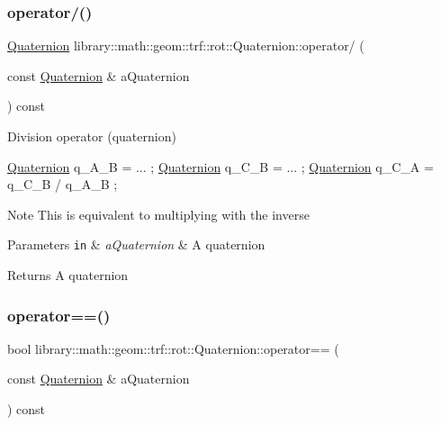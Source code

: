 \subsubsection{\texorpdfstring{operator/()}{operator/()}}
{\footnotesize\ttfamily \hyperlink{classlibrary_1_1math_1_1geom_1_1trf_1_1rot_1_1_quaternion}{Quaternion} library\+::math\+::geom\+::trf\+::rot\+::\+Quaternion\+::operator/ (\begin{DoxyParamCaption}\item[{const \hyperlink{classlibrary_1_1math_1_1geom_1_1trf_1_1rot_1_1_quaternion}{Quaternion} \&}]{a\+Quaternion }\end{DoxyParamCaption}) const}



Division operator (quaternion) 


\begin{DoxyCode}
\hyperlink{classlibrary_1_1math_1_1geom_1_1trf_1_1rot_1_1_quaternion_aa7f459a08f5af38b9f7676a6bf36a21c}{Quaternion} q\_A\_B = ... ;
\hyperlink{classlibrary_1_1math_1_1geom_1_1trf_1_1rot_1_1_quaternion_aa7f459a08f5af38b9f7676a6bf36a21c}{Quaternion} q\_C\_B = ... ;
\hyperlink{classlibrary_1_1math_1_1geom_1_1trf_1_1rot_1_1_quaternion_aa7f459a08f5af38b9f7676a6bf36a21c}{Quaternion} q\_C\_A = q\_C\_B / q\_A\_B ;
\end{DoxyCode}


\begin{DoxyNote}{Note}
This is equivalent to multiplying with the inverse
\end{DoxyNote}

\begin{DoxyParams}[1]{Parameters}
\mbox{\tt in}  & {\em a\+Quaternion} & A quaternion \\
\hline
\end{DoxyParams}
\begin{DoxyReturn}{Returns}
A quaternion 
\end{DoxyReturn}
\mbox{\label{classlibrary_1_1math_1_1geom_1_1trf_1_1rot_1_1_quaternion_aa3ab0b3893007c45e5cc8ed5e1d16ef0}} 
\subsubsection{\texorpdfstring{operator==()}{operator==()}}
{\footnotesize\ttfamily bool library\+::math\+::geom\+::trf\+::rot\+::\+Quaternion\+::operator== (\begin{DoxyParamCaption}\item[{const \hyperlink{classlibrary_1_1math_1_1geom_1_1trf_1_1rot_1_1_quaternion}{Quaternion} \&}]{a\+Quaternion }\end{DoxyParamCaption}) const}



